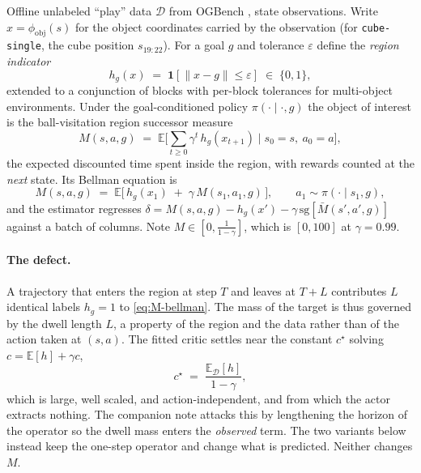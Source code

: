 \documentclass{article}
\providecommand{\E}{\mathbb{E}}
\newcommand{\ind}[1]{\mathbf{1}\!\left[#1\right]}
\newcommand{\sg}{\mathrm{sg}}
\begin{document}
Offline unlabeled ``play'' data $\mathcal{D}$ from OGBench
\citep{park2024ogbench}, state observations. Write $x=\phi_{\mathrm{obj}}(s)$ for
the object coordinates carried by the observation (for \texttt{cube-single}, the
cube position $s_{19:22}$). For a goal $g$ and tolerance $\varepsilon$ define the
\emph{region indicator}
\begin{equation}
h_g(x) \;=\; \ind{\|x-g\|\le\varepsilon} \;\in\;\{0,1\},
\label{eq:indicator}
\end{equation}
extended to a conjunction of blocks with per-block tolerances for multi-object
environments. Under the goal-conditioned policy $\pi(\cdot\mid\cdot,g)$ the
object of interest is the ball-visitation region successor measure
\citep{dayan1993improving,blier2021learning,touati2021learning}
\begin{equation}
M(s,a,g) \;=\; \E\Big[\textstyle\sum_{t\ge0}\gamma^{t}\,h_g(x_{t+1})
\;\Big|\; s_0=s,\ a_0=a\Big],
\label{eq:M}
\end{equation}
the expected discounted time spent inside the region, with rewards counted at
the \emph{next} state. Its Bellman equation is
\begin{equation}
M(s,a,g) \;=\; \E\big[\,h_g(x_1) \;+\; \gamma\,M(s_1,a_1,g)\,\big],
\qquad a_1\sim\pi(\cdot\mid s_1,g),
\label{eq:M-bellman}
\end{equation}
and the estimator regresses
$\delta = M(s,a,g) - h_g(x') - \gamma\,\sg[\bar M(s',a',g)]$ against a batch of
columns. Note $M\in[0,\tfrac{1}{1-\gamma}]$, which is $[0,100]$ at
$\gamma=0.99$.

\paragraph{The defect.} A trajectory that enters the region at step $T$ and
leaves at $T+L$ contributes $L$ identical labels $h_g=1$ to
\eqref{eq:M-bellman}. The mass of the target is thus governed by the dwell
length $L$, a property of the region and the data rather than of the action
taken at $(s,a)$. The fitted critic settles near the constant $c^{\star}$
solving $c=\E[h]+\gamma c$,
\begin{equation}
c^{\star} \;=\; \frac{\E_{\mathcal{D}}[h]}{1-\gamma},
\label{eq:dwell-constant}
\end{equation}
which is large, well scaled, and action-independent, and from which the actor
extracts nothing. The companion note attacks this by lengthening the horizon of
the operator so the dwell mass enters the \emph{observed} term. The two variants
below instead keep the one-step operator and change what is predicted. Neither
changes $M$.
\end{document}
